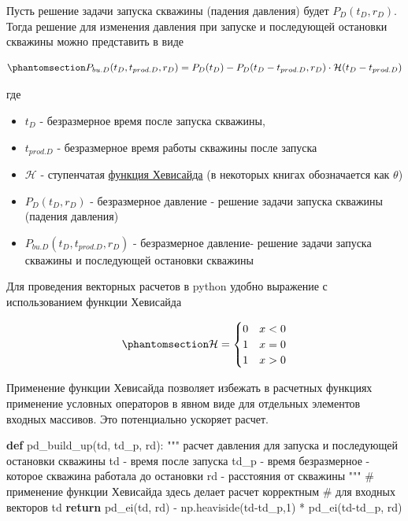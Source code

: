 \documentclass[
  russian,
  letterpaper,
  DIV=11,
  numbers=noendperiod,
  oneside]{scrartcl}
\newenvironment{Shaded}{\begin{snugshade}}{\end{snugshade}}
\newcommand{\CommentTok}[1]{\textcolor[rgb]{0.37,0.37,0.37}{#1}}
\newcommand{\ControlFlowTok}[1]{\textcolor[rgb]{0.00,0.23,0.31}{\textbf{#1}}}
\newcommand{\DecValTok}[1]{\textcolor[rgb]{0.68,0.00,0.00}{#1}}
\newcommand{\KeywordTok}[1]{\textcolor[rgb]{0.00,0.23,0.31}{\textbf{#1}}}
\newcommand{\NormalTok}[1]{\textcolor[rgb]{0.00,0.23,0.31}{#1}}
\newcommand{\OperatorTok}[1]{\textcolor[rgb]{0.37,0.37,0.37}{#1}}
\providecommand{\tightlist}{%
  \setlength{\itemsep}{0pt}\setlength{\parskip}{0pt}}
\begin{document}
Пусть решение задачи запуска скважины (падения давления) будет
\(P_D(t_D, r_D)\). Тогда решение для изменения давления при запуске и
последующей остановки скважины можно представить в виде

\begin{equation}\phantomsection\label{eq-pd_build_up}{
P_{bu.D}(t_D, t_{prod.D}, r_D) = P_D(t_D) - P_D(t_D-t_{prod.D}, r_D) \cdot \mathcal{H}(t_D-t_{prod.D})
}\end{equation}

где

\begin{itemize}
\tightlist
\item
  \(t_D\) - безразмерное время после запуска скважины,
\item
  \(t_{prod.D}\) - безразмерное время работы скважины после запуска
\item
  \(\mathcal{H}\) - ступенчатая
  \href{https://ru.wikipedia.org/wiki/\%D0\%A4\%D1\%83\%D0\%BD\%D0\%BA\%D1\%86\%D0\%B8\%D1\%8F_\%D0\%A5\%D0\%B5\%D0\%B2\%D0\%B8\%D1\%81\%D0\%B0\%D0\%B9\%D0\%B4\%D0\%B0}{функция
  Хевисайда} (в некоторых книгах обозначается как \(\theta\))
\item
  \(P_D(t_D, r_D)\) - безразмерное давление - решение задачи запуска
  скважины (падения давления)
\item
  \(P_{bu.D}(t_D, t_{prod.D}, r_D)\) - безразмерное давление- решение
  задачи запуска скважины и последующей остановки скважины
\end{itemize}

Для проведения векторных расчетов в python удобно выражение с
использованием функции Хевисайда

\begin{equation}\phantomsection\label{eq-heavyside_fn}{ 
\mathcal{H} = \begin{cases}0 & x < 0\\1 & x = 0\\1 & x > 0\end{cases}
}\end{equation}

Применение функции Хевисайда позволяет избежать в расчетных функциях
применение условных операторов в явном виде для отдельных элементов
входных массивов. Это потенциально ускоряет расчет.

\begin{Shaded}
\begin{Highlighting}[]
\KeywordTok{def}\NormalTok{ pd\_build\_up(td, td\_p, rd):}
    \CommentTok{"""}
\CommentTok{    расчет давления для запуска и последующей остановки скважины}
\CommentTok{    td {-} время после запуска}
\CommentTok{    td\_p {-} время безразмерное {-} которое скважина работала до остановки}
\CommentTok{    rd {-} расстояния от скважины}
\CommentTok{    """}
    \CommentTok{\# применение функции Хевисайда здесь делает расчет корректным}
    \CommentTok{\# для входных векторов td}
    \ControlFlowTok{return}\NormalTok{ pd\_ei(td, rd) }\OperatorTok{{-}}\NormalTok{ np.heaviside(td}\OperatorTok{{-}}\NormalTok{td\_p,}\DecValTok{1}\NormalTok{) }\OperatorTok{*}\NormalTok{ pd\_ei(td}\OperatorTok{{-}}\NormalTok{td\_p, rd)}
\end{Highlighting}
\end{Shaded}
\end{document}
